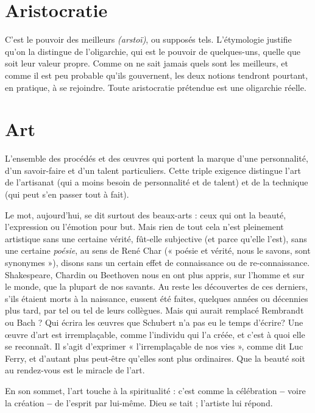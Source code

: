 \section{Aristocratie}
C’est le pouvoir des meilleurs {\it (arstoï)}, ou supposés tels.
L'étymologie justifie qu’on la distingue de l’oligarchie, qui
est le pouvoir de quelques-uns, quelle que soit leur valeur propre. Comme on
ne sait jamais quels sont les meilleurs, et comme il est peu probable qu’ils gouvernent,
les deux notions tendront pourtant, en pratique, à se rejoindre. Toute
aristocratie prétendue est une oligarchie réelle.

\section{Art}
L'ensemble des procédés et des œuvres qui portent la marque d’une
personnalité, d’un savoir-faire et d’un talent particuliers. Cette triple
exigence distingue l’art de l'artisanat (qui a moins besoin de personnalité et de
talent) et de la technique (qui peut s’en passer tout à fait).

Le mot, aujourd’hui, se dit surtout des beaux-arts : ceux qui ont la beauté,
l'expression ou l'émotion pour but. Mais rien de tout cela n’est pleinement
artistique sans une certaine vérité, fût-elle subjective (et parce qu’elle l’est),
sans une certaine {\it poésie}, au sens de René Char (« poésie et vérité, nous le
savons, sont synonymes »), disons sans un certain effet de connaissance ou de
re-connaissance. Shakespeare, Chardin ou Beethoven nous en ont plus appris,
sur l’homme et sur le monde, que la plupart de nos savants. Au reste les découvertes
de ces derniers, s’ils étaient morts à la naissance, eussent été faites,
quelques années ou décennies plus tard, par tel ou tel de leurs collègues. Mais
qui aurait remplacé Rembrandt ou Bach ? Qui écrira les œuvres que Schubert
n'a pas eu le temps d'écrire? Une œuvre d’art est irremplaçable, comme
l'individu qui l’a créée, et c’est à quoi elle se reconnaît. Il s’agit d’exprimer
« l’irremplaçable de nos vies », comme dit Luc Ferry, et d’autant plus peut-être
qu'elles sont plus ordinaires. Que la beauté soit au rendez-vous est le miracle de
l'art.

En son sommet, l’art touche à la spiritualité : c’est comme la célébration {\bf --}
voire la création {\bf --} de l'esprit par lui-même. Dieu se tait ; l’artiste lui répond.

